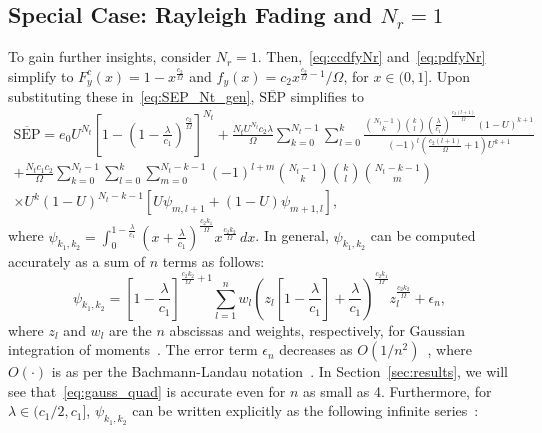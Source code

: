 \documentclass[12pt,draftcls,peerreview,onecolumn]{IEEEtran}
\newcommand{\SEP}{\text{SEP}}
\newcommand{\nck}[2]{\binom{#1}{#2}}
\newcommand{\lam}{\lambda}
\newcommand{\error}{\epsilon_n}
\newcommand{\Nt}{{N_t}}
\newcommand{\Nr}{{N_r}}
\newcommand{\cone}{c_{1}}
\newcommand{\ctwo}{c_{2}}
\newcommand{\lambym}{\frac{\lam}{\cone}}
\newcommand{\al}{\ctwo}
\newcommand{\snr}{\Omega}
\newcommand{\albysnr}[1][]{\frac{\al#1}{\snr}}
\newcommand{\un}{U}
\newcommand{\psifun}[2]{\psi_{{#1},{#2}}}
\newcommand{\onemlc}{\left[1-\lambym\right]}
\newcommand{\zerosep}{e_0}
\newcommand{\avgSEP}{\overline{\SEP}}
\newcommand{\gqsym}{z_{\lidx}}
\newcommand{\gqwt}{w_{\lidx}}
\newcommand{\lidx}{l}
\newcommand{\midx}{m}
\begin{document}
\subsection{Special Case: Rayleigh Fading and $\Nr=1$} 
To gain further insights, consider $\Nr = 1$. Then,~\eqref{eq:ccdfyNr} and~\eqref{eq:pdfyNr} simplify to $F_{y}^{c}(x) = 1-x^{\albysnr}$ and $f_{y}(x) = \al x^{\albysnr-1}/\snr$, for $x \in (0,1]$. Upon substituting these in~\eqref{eq:SEP_Nt_gen}, $\avgSEP$ simplifies to 
%
\begin{multline}
\label{eq:avgSEPoneNr} 
\avgSEP =\zerosep\un^{\Nt}\!\left[1-\left(1-\lambym\right)^{\!\albysnr[]}\right]^{\Nt}
+ \frac{\Nt\un^{\Nt}\al\lam}{\snr} \sum_{k=0}^{\Nt-1}\sum_{\lidx=0}^{k} \frac{\nck{\Nt-1}{k} \nck{k}{\lidx}\left(\lambym\right)^{\albysnr[(\lidx+1)]}\left(1-\un\right)^{k+1} }{(-1)^{\lidx} \left( \albysnr[(\lidx+1)]+1\right)\un^{k+1} }\\ + \frac{\Nt\cone\al}{\snr} \sum_{k=0}^{\Nt-1} \sum_{\lidx=0}^{k} \sum_{\midx=0}^{\Nt-k-1} (-1)^{\lidx+\midx}  \binom{\Nt-1}{k} \binom{k}{\lidx} \binom{\Nt-k-1}{\midx} \\\times\un^{k} (1-\un)^{\Nt-k-1} \left[ \un\psifun{\midx}{\lidx+1} +  \left(1-\un\right) \psifun{\midx+1}{\lidx} \right]
,
\end{multline}
where $\psifun{k_1}{k_2} = \int_{0}^{1-\frac{\lam}{\cone}} \left(x+\lambym\right)^{\albysnr[k_1]} x^{\albysnr[k_2]} \,dx$. In general, $\psifun{k_1}{k_2}$ can be computed accurately as a sum of $n$  terms as follows: 
\begin{equation}
\psifun{k_1}{k_2} ={\onemlc^{\albysnr[k_2]+1}} \sum_{\lidx=1}^{n} \gqwt {\left(\!\gqsym\onemlc +\lambym\right)}^{\albysnr[k_1]} \gqsym^{\albysnr[k_2]} + \error,
\label{eq:gauss_quad}
\end{equation}
where $\gqsym$ and $\gqwt$ are the $n$ abscissas and weights, respectively, for Gaussian integration of moments~\cite[pp. 921-922]{abramowitz_stegun}. The error term $\error$ decreases as $O(1/n^2)$~\cite{Xiang_2012_SIAM}, where $O(\cdot)$ is as per the Bachmann-Landau notation~\cite[Chap. 3]{CLRS_algo_book}. In Section~\ref{sec:results}, we will see that~\eqref{eq:gauss_quad}  is accurate even for $n$ as small as 4. Furthermore, for $\lam\in({\cone}/{2}, \cone]$, $\psifun{k_1}{k_2}$ can be written explicitly as the following infinite series~\cite{gradshteyn00_book}:
%
\end{document}
